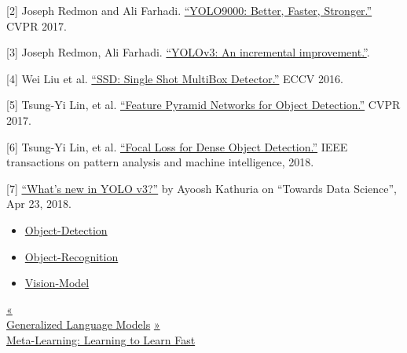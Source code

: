 {[}2{]} Joseph Redmon and Ali Farhadi. \href{http://openaccess.thecvf.com/content_cvpr_2017/papers/Redmon_YOLO9000_Better_Faster_CVPR_2017_paper.pdf}{``YOLO9000: Better, Faster, Stronger.''} CVPR 2017.

{[}3{]} Joseph Redmon, Ali Farhadi. \href{https://pjreddie.com/media/files/papers/YOLOv3.pdf}{``YOLOv3: An incremental improvement.''}.

{[}4{]} Wei Liu et al. \href{https://arxiv.org/abs/1512.02325}{``SSD: Single Shot MultiBox Detector.''} ECCV 2016.

{[}5{]} Tsung-Yi Lin, et al. \href{https://arxiv.org/abs/1612.03144}{``Feature Pyramid Networks for Object Detection.''} CVPR 2017.

{[}6{]} Tsung-Yi Lin, et al. \href{https://arxiv.org/abs/1708.02002}{``Focal Loss for Dense Object Detection.''} IEEE transactions on pattern analysis and machine intelligence, 2018.

{[}7{]} \href{https://towardsdatascience.com/yolo-v3-object-detection-53fb7d3bfe6b}{``What's new in YOLO v3?''} by Ayoosh Kathuria on ``Towards Data Science'', Apr 23, 2018.

\begin{itemize}
\tightlist
\item
  \href{https://lilianweng.github.io/tags/object-detection/}{Object-Detection}
\item
  \href{https://lilianweng.github.io/tags/object-recognition/}{Object-Recognition}
\item
  \href{https://lilianweng.github.io/tags/vision-model/}{Vision-Model}
\end{itemize}

\href{https://lilianweng.github.io/posts/2019-01-31-lm/}{{« }\\
{Generalized Language Models}} \href{https://lilianweng.github.io/posts/2018-11-30-meta-learning/}{{ »}\\
{Meta-Learning: Learning to Learn Fast}}

